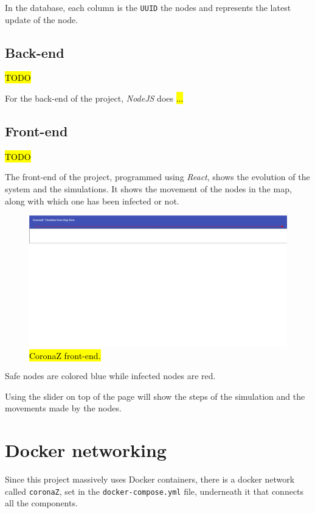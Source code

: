 \documentclass[conference]{IEEEtran}
\begin{document}
		In the database, each column is the \texttt{UUID} the nodes and represents the latest update of the node.
	
	\subsection{Back-end}
	
		\hl{TODO}
		
		For the back-end of the project, \textit{NodeJS} does \hl{...}
	
	\subsection{Front-end}

		\hl{TODO}

		The front-end of the project, programmed using \textit{React}, shows the evolution of the system and the simulations.
		It shows the movement of the nodes in the map, along with which one has been infected or not.
		
		\begin{figure}[htbp]
			\centerline{\includegraphics[width=\linewidth]{img/frontend.png}}
			\caption{\hl{CoronaZ front-end.}}
			\label{fig:front-end}
		\end{figure}
	
		Safe nodes are colored blue while infected nodes are red.
		
		Using the slider on top of the page will show the steps of the simulation and the movements made by the nodes.
	
\section{Docker networking}\label{sec:network}

	Since this project massively uses Docker containers, there is a docker network called \texttt{coronaZ}, set in the \texttt{docker-compose.yml} file, underneath it that connects all the components.
	
\end{document}
